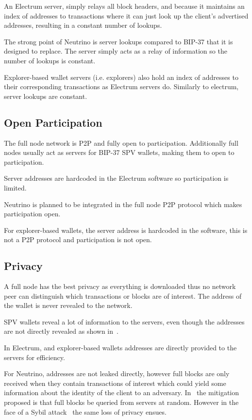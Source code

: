 An Electrum server, simply relays all block headers, and because it maintains an index of addresses to transactions where it can just look up the client's advertised addresses, resulting in a constant number of lookups.

The strong point of Neutrino is server lookups compared to BIP-37 that it is designed to replace. The server simply acts as a relay of information so the number of lookups is constant.

Explorer-based wallet servers (i.e. explorers) also hold an index of addresses to their corresponding transactions as Electrum servers do. Similarly to electrum, server lookups are constant.

\subsection{Open Participation}
The full node network is P2P and fully open to participation.  Additionally full nodes usually act as servers for BIP-37 SPV wallets, making them to open to participation.

Server addresses are hardcoded in the Electrum software so participation is limited.

Neutrino is planned to be integrated in the full node P2P protocol which makes participation open.

For explorer-based wallets, the server address is hardcoded in the software, this is not a P2P protocol and participation is not open.

\subsection{Privacy}
A full node has the best privacy as everything is downloaded thus no network peer can distinguish which transactions or blocks are of interest. The address of the wallet is never revealed to the network. 

SPV wallets reveal a lot of information to the servers, even though the addresses are not directly revealed as shown in~\cite{gervais2014privacy}.


In Electrum, and explorer-based wallets addresses are directly provided to the servers for efficiency.

For Neutrino, addresses are not leaked directly, however full blocks are only received when they contain transactions of interest which could yield some information about the identity of the client to an adversary. In~\cite{bip157} the mitigation proposed is that full blocks be queried from servers at random. However in the face of a Sybil attack~\cite{sybil} the same loss of privacy ensues.


